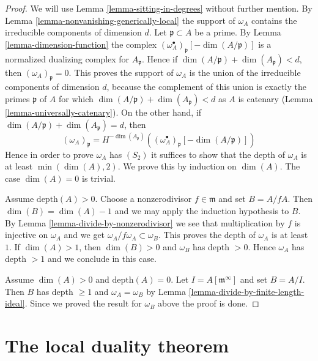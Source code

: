 \documentclass{stacks-project}
\theoremstyle{plain}
\theoremstyle{definition}
\theoremstyle{remark}
\numberwithin{equation}{subsection}
\begin{document}
\begin{proof}
We will use Lemma \ref{lemma-sitting-in-degrees} without further mention.
By Lemma \ref{lemma-nonvanishing-generically-local} the support
of $\omega_A$ contains the irreducible components of dimension $d$.
Let $\mathfrak p \subset A$ be a prime. By Lemma \ref{lemma-dimension-function}
the complex $(\omega_A^\bullet)_{\mathfrak p}[-\dim(A/\mathfrak p)]$
is a normalized dualizing complex for $A_\mathfrak p$. Hence if
$\dim(A/\mathfrak p) + \dim(A_\mathfrak p) < d$, then
$(\omega_A)_\mathfrak p = 0$.
This proves the support of $\omega_A$ is the union of the irreducible
components of dimension $d$, because the complement of this union
is exactly the primes $\mathfrak p$ of $A$ for which
$\dim(A/\mathfrak p) + \dim(A_\mathfrak p) < d$ as $A$ is catenary
(Lemma \ref{lemma-universally-catenary}).
On the other hand, if $\dim(A/\mathfrak p) + \dim(A_\mathfrak p) = d$, then
$$
(\omega_A)_\mathfrak p =
H^{-\dim(A_\mathfrak p)}\left(
(\omega_A^\bullet)_{\mathfrak p}[-\dim(A/\mathfrak p)] \right)
$$
Hence in order to prove $\omega_A$ has $(S_2)$ it suffices to show that
the depth of $\omega_A$ is at least $\min(\dim(A), 2)$.
We prove this by induction on $\dim(A)$. The case $\dim(A) = 0$ is
trivial.

\medskip\noindent
Assume $\text{depth}(A) > 0$. Choose a nonzerodivisor $f \in \mathfrak m$
and set $B = A/fA$. Then $\dim(B) = \dim(A) - 1$ and we may apply the
induction hypothesis to $B$. By Lemma \ref{lemma-divide-by-nonzerodivisor}
we see that multiplication by $f$ is injective on $\omega_A$ and we get
$\omega_A/f\omega_A \subset \omega_B$. This proves the depth of $\omega_A$
is at least $1$. If $\dim(A) > 1$, then $\dim(B) > 0$ and $\omega_B$
has depth $ > 0$. Hence $\omega_A$ has depth $> 1$ and we conclude in
this case.

\medskip\noindent
Assume $\dim(A) > 0$ and $\text{depth}(A) = 0$. Let
$I = A[\mathfrak m^\infty]$ and set $B = A/I$. Then $B$ has
depth $\geq 1$ and $\omega_A = \omega_B$ by
Lemma \ref{lemma-divide-by-finite-length-ideal}.
Since we proved the result for $\omega_B$ above the proof is done.
\end{proof}





\section{The local duality theorem}
\label{section-local-duality}
\end{document}
